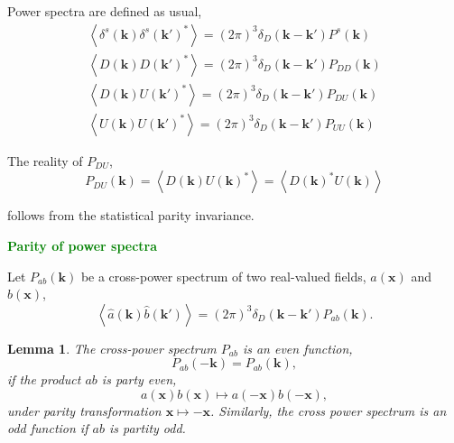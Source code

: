 \documentclass[a4paper,11pt, fleqn]{article}
\newtheorem{lemma}{Lemma}
\begin{document}
\vspace{10mm}
Power spectra are defined as usual,
\begin{align}
  \left\langle \delta^s(\bm{k}) \delta^s(\bm{k}')^* \right\rangle
    = (2\pi)^3 \delta_D(\bm{k} - \bm{k}') P^s(\bm{k})\\
  \left\langle D(\bm{k}) D(\bm{k}')^* \right\rangle
    = (2\pi)^3 \delta_D(\bm{k} - \bm{k}') P_{DD}(\bm{k})\\
  \left\langle D(\bm{k}) U(\bm{k}')^* \right\rangle
    = (2\pi)^3 \delta_D(\bm{k} - \bm{k}') P_{DU}(\bm{k})\\
  \left\langle U(\bm{k}) U(\bm{k}')^* \right\rangle
    = (2\pi)^3 \delta_D(\bm{k} - \bm{k}') P_{UU}(\bm{k})
\end{align}

\vspace{10mm}
The reality of $P_{DU}$,
%
\begin{equation}
  P_{DU}(\bm{k}) = \left\langle D(\bm{k}) U(\bm{k})^* \right\rangle =
  \left\langle D(\bm{k})^* U(\bm{k}) \right\rangle
\end{equation}

follows from the statistical parity invariance. 

%
%
\newpage

{\Huge \textbf{\textcolor{Green}{Parity of power spectra}}}
\vspace{10mm}

Let $P_{ab}(\bm{k})$ be a cross-power spectrum of two real-valued
fields, $a(\bm{x})$ and $b(\bm{x})$,
%
\begin{equation}
  \left\langle \hat{a}(\bm{k}) \hat{b}(\bm{k}') \right\rangle
  = (2\pi)^3 \delta_D(\bm{k} - \bm{k}') P_{ab}(\bm{k}).
\end{equation}

\vspace{5mm}
\begin{lemma}
  The cross-power spectrum $P_{ab}$ is an even function,
  \begin{equation}
    P_{ab}(-\bm{k}) = P_{ab}(\bm{k}),
  \end{equation}
  if the product $ab$ is party even,
  \begin{equation}
    a(\bm{x}) b(\bm{x}) \mapsto a(-\bm{x}) b(-\bm{x}),
  \end{equation}
  under parity transformation $\bm{x} \mapsto -\bm{x}$. Similarly, the
  cross power spectrum is an odd function if $ab$ is partity odd.
\end{lemma}
\end{document}

